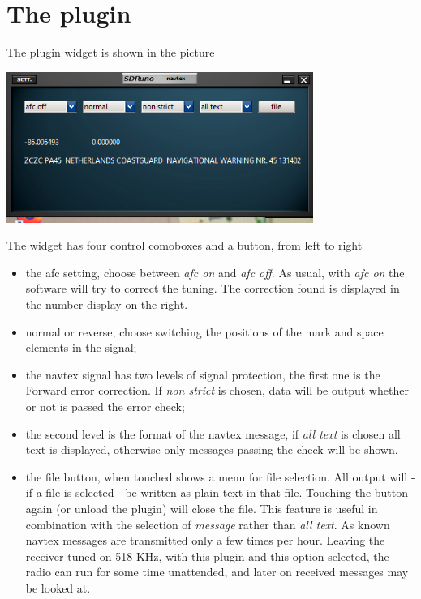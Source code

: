 \documentclass[11pt]{article}
\begin{document}
\section{The plugin}
The plugin widget  is shown in the picture

\includegraphics[width=100mm]{navtex-plugin-widget.png}

The widget has four control comoboxes and a button, from left to right
\begin{itemize}
\item the afc setting, choose between {\em afc on} and {\em afc off}. As usual,
with {\em afc on}  the software will try to correct the tuning. The
correction found is displayed in the number display on the right.
\item normal or reverse, choose switching the positions of the mark
and space elements in the signal;
\item the navtex signal has two levels of signal protection, the first one
is the Forward error correction. If {\em non strict} is chosen, data
will be output whether or not is passed the error check;
\item the second level is the format of the navtex message, if {\em all text}
is chosen all text is displayed, otherwise only messages passing the check
will be shown.
\item the file button, when touched shows a menu for file selection. All
output will - if a file is selected - be written as plain text in that
file.
Touching the button again (or unload the plugin) will close the file.
This feature is useful in combination with the selection of {\em message}
rather than {\em all text}. As known navtex messages are transmitted
only a few times per hour. Leaving the receiver tuned on 518 KHz, with
this plugin and this option selected, the radio can run for some time 
unattended, and later on received messages may be looked at.
\end{itemize}
\end{document}
